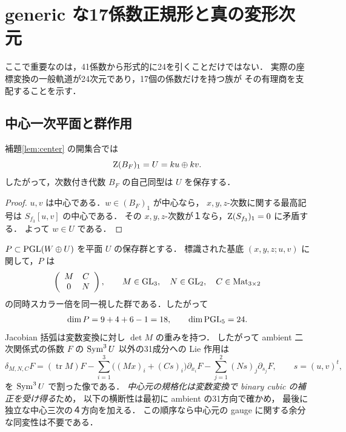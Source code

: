 \section{generic な17係数正規形と真の変形次元}\label{sec:normal}
ここで重要なのは，41係数から形式的に24を引くことだけではない．
実際の座標変換の一般軌道が24次元であり，17個の係数だけを持つ族が
その有理商を支配することを示す．

\subsection{中心一次平面と群作用}
\begin{lemma}[一次中心による平面の復元]\label{lem:U}
補題\ref{lem:center} の開集合では
\begin{equation}\label{eq:Z1}
 \operatorname{Z}(B_F)_1=U=ku\oplus kv.
\end{equation}
したがって，次数付き代数 $B_F$ の自己同型は $U$ を保存する．
\end{lemma}
\begin{proof}
$u,v$ は中心である．$w\in (B_F)_1$ が中心なら，
$x,y,z$-次数に関する最高記号は $S_{f_3}[u,v]$ の中心である．
その $x,y,z$-次数が１なら，$\operatorname{Z}(S_{f_3})_1=0$ に矛盾する．
よって $w\in U$ である．
\end{proof}

$P\subset\mathrm{PGL}(W\oplus U)$ を平面 $U$ の保存群とする．
標識された基底 $(x,y,z;u,v)$ に関して，$P$ は
\[
 \left(\begin{array}{cc}M&C\\0&N\end{array}\right),\qquad
 M\in\mathrm{GL}_3,\quad N\in\mathrm{GL}_2,\quad C\in\operatorname{Mat}_{3\times2}
\]
の同時スカラー倍を同一視した群である．したがって
\begin{equation}\label{eq:dimP}
 \dim P=9+4+6-1=18,
 \qquad\dim\mathrm{PGL}_5=24.
\end{equation}
Jacobian 括弧は変数変換に対し $\det M$ の重みを持つ．
したがって ambient 二次関係式の係数 $F$ の
$\operatorname{Sym}^3U$ 以外の31成分への Lie 作用は
\begin{equation}\label{eq:Lie}
 \delta_{M,N,C}F=(\operatorname{tr}M)F
 -\sum_{i=1}^{3}\bigl((Mx)_i+(Cs)_i\bigr)\partial_{x_i}F
 -\sum_{j=1}^{2}(Ns)_j\partial_{s_j}F,
 \qquad s=(u,v)^t,
\end{equation}
を $\operatorname{Sym}^3U$ で割った像である．
\emph{中心元の規格化は変数変換で binary cubic の補正を受け得る}ため，
以下の横断性は最初に ambient の31方向で確かめ，
最後に独立な中心三次の４方向を加える．
この順序なら中心元の gauge に関する余分な同変性は不要である．

